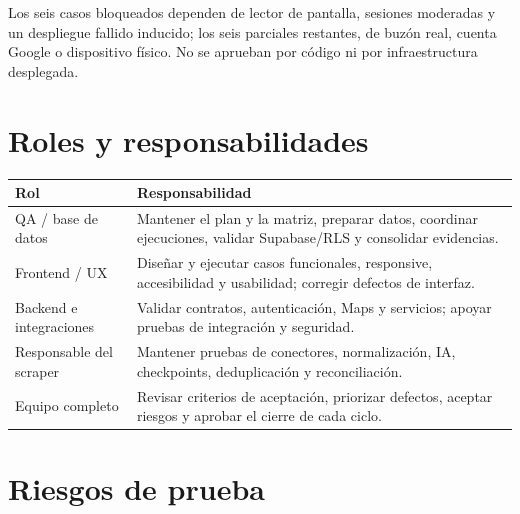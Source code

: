\documentclass[11pt,a4paper]{article}
\begin{document}
Los seis casos bloqueados dependen de lector de pantalla, sesiones moderadas y un
despliegue fallido inducido; los seis parciales restantes, de buzón real, cuenta Google o
dispositivo físico. No se aprueban por código ni por infraestructura desplegada.

\section{Roles y responsabilidades}

\begin{longtable}{@{}L{3.7cm}L{11.1cm}@{}}
\toprule
\textbf{Rol} & \textbf{Responsabilidad} \\
\midrule
\endhead
QA / base de datos & Mantener el plan y la matriz, preparar datos, coordinar ejecuciones, validar Supabase/RLS y consolidar evidencias. \\
Frontend / UX & Diseñar y ejecutar casos funcionales, responsive, accesibilidad y usabilidad; corregir defectos de interfaz. \\
Backend e integraciones & Validar contratos, autenticación, Maps y servicios; apoyar pruebas de integración y seguridad. \\
Responsable del scraper & Mantener pruebas de conectores, normalización, IA, checkpoints, deduplicación y reconciliación. \\
Equipo completo & Revisar criterios de aceptación, priorizar defectos, aceptar riesgos y aprobar el cierre de cada ciclo. \\
\bottomrule
\end{longtable}

\section{Riesgos de prueba}
\end{document}
